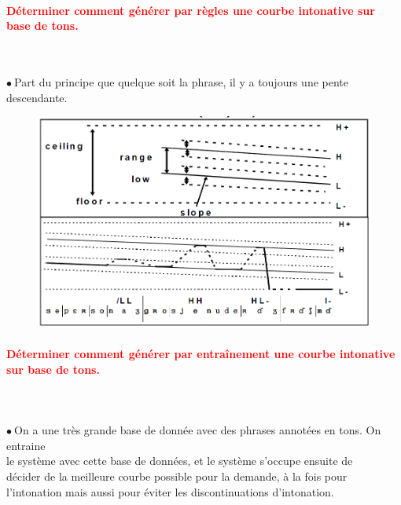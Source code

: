 \documentclass[letterpaper, 12pt]{article}
\newcommand{\alinea}{
\hspace*{0.3cm}}
\newcommand{\red}[1]{
	\textcolor{red}{#1}
}
\newcommand{\point}{$\bullet\ $}
\begin{document}
		\paragraph{\red{Déterminer comment générer par règles une courbe intonative sur base de tons.}}~\\
			\begin{minipage}{0.4\textwidth}
				\point Part du principe que quelque soit la phrase, il y a toujours une pente descendante.
			\end{minipage}\hfill
			\begin{minipage}{0.55\textwidth}
				\begin{figure}[H]
					\centering
					\includegraphics[scale=0.425]{Images/tones_rules}
				\end{figure}\noindent
			\end{minipage}
		\paragraph{\red{Déterminer comment générer par entraînement une courbe intonative sur base de tons.}}~\\~\\
			\point On a une très grande base de donnée avec des phrases annotées en tons. On entraine
				\\\alinea le système avec cette base de données, et le système s'occupe ensuite de
				\\\alinea décider de la meilleure courbe possible pour la demande, à la fois pour
				\\\alinea l'intonation mais aussi pour éviter les discontinuations d'intonation.
\end{document}
